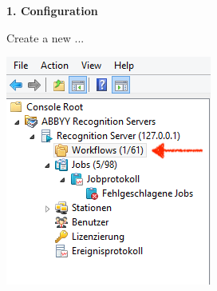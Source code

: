 \noindent
\textbf{1. Configuration}

\noindent
Create a new ...

\medskip

\begin{center}
\includegraphics[scale=0.6]{main.png}
\end{center}

\medskip

